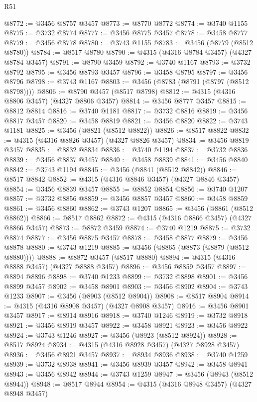 \begin{lexlean}{R51}
\begin{coremodule}
@8772 := @3456 @8757 @3457
@8773 := @8770 @8772
@8774 := @3740 @1155
@8775 := @3732 @8774
@8777 := @3456 @8775 @3457
@8778 := @3458 @8777
@8779 := @3456 @8778
@8780 := @3743 @1155
@8783 := @3456 (@8779 (@8512 @8780))
@8784 := @8517 @8780
@8790 := @4315 (@4316 @8784 @3457) (@4327 @8784 @3457)
@8791 := @8790 @3459
@8792 := @3740 @1167
@8793 := @3732 @8792
@8795 := @3456 @8793 @3457
@8796 := @3458 @8795
@8797 := @3456 @8796
@8798 := @3743 @1167
@8803 := @3456 (@8783 (@8791 (@8797 (@8512 @8798))))
@8806 := @8790 @3457 (@8517 @8798)
@8812 := @4315 (@4316 @8806 @3457) (@4327 @8806 @3457)
@8814 := @3456 @8777 @3457
@8815 := @8812 @8814
@8816 := @3740 @1181
@8817 := @3732 @8816
@8819 := @3456 @8817 @3457
@8820 := @3458 @8819
@8821 := @3456 @8820
@8822 := @3743 @1181
@8825 := @3456 (@8821 (@8512 @8822))
@8826 := @8517 @8822
@8832 := @4315 (@4316 @8826 @3457) (@4327 @8826 @3457)
@8834 := @3456 @8819 @3457
@8835 := @8832 @8834
@8836 := @3740 @1194
@8837 := @3732 @8836
@8839 := @3456 @8837 @3457
@8840 := @3458 @8839
@8841 := @3456 @8840
@8842 := @3743 @1194
@8845 := @3456 (@8841 (@8512 @8842))
@8846 := @8517 @8842
@8852 := @4315 (@4316 @8846 @3457) (@4327 @8846 @3457)
@8854 := @3456 @8839 @3457
@8855 := @8852 @8854
@8856 := @3740 @1207
@8857 := @3732 @8856
@8859 := @3456 @8857 @3457
@8860 := @3458 @8859
@8861 := @3456 @8860
@8862 := @3743 @1207
@8865 := @3456 (@8861 (@8512 @8862))
@8866 := @8517 @8862
@8872 := @4315 (@4316 @8866 @3457) (@4327 @8866 @3457)
@8873 := @8872 @3459
@8874 := @3740 @1219
@8875 := @3732 @8874
@8877 := @3456 @8875 @3457
@8878 := @3458 @8877
@8879 := @3456 @8878
@8880 := @3743 @1219
@8885 := @3456 (@8865 (@8873 (@8879 (@8512 @8880))))
@8888 := @8872 @3457 (@8517 @8880)
@8894 := @4315 (@4316 @8888 @3457) (@4327 @8888 @3457)
@8896 := @3456 @8859 @3457
@8897 := @8894 @8896
@8898 := @3740 @1233
@8899 := @3732 @8898
@8901 := @3456 @8899 @3457
@8902 := @3458 @8901
@8903 := @3456 @8902
@8904 := @3743 @1233
@8907 := @3456 (@8903 (@8512 @8904))
@8908 := @8517 @8904
@8914 := @4315 (@4316 @8908 @3457) (@4327 @8908 @3457)
@8916 := @3456 @8901 @3457
@8917 := @8914 @8916
@8918 := @3740 @1246
@8919 := @3732 @8918
@8921 := @3456 @8919 @3457
@8922 := @3458 @8921
@8923 := @3456 @8922
@8924 := @3743 @1246
@8927 := @3456 (@8923 (@8512 @8924))
@8928 := @8517 @8924
@8934 := @4315 (@4316 @8928 @3457) (@4327 @8928 @3457)
@8936 := @3456 @8921 @3457
@8937 := @8934 @8936
@8938 := @3740 @1259
@8939 := @3732 @8938
@8941 := @3456 @8939 @3457
@8942 := @3458 @8941
@8943 := @3456 @8942
@8944 := @3743 @1259
@8947 := @3456 (@8943 (@8512 @8944))
@8948 := @8517 @8944
@8954 := @4315 (@4316 @8948 @3457) (@4327 @8948 @3457)

\end{coremodule}
\end{lexlean}
